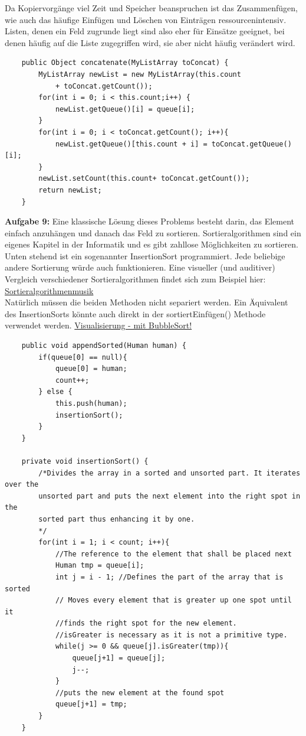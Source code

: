 \documentclass{article}
\begin{document}
Da Kopiervorgänge viel Zeit und Speicher beanspruchen ist das Zusammenfügen, wie auch das häufige Einfügen und Löschen von Einträgen ressourcenintensiv. Listen, denen ein Feld zugrunde liegt sind also eher für Einsätze geeignet, bei denen häufig auf die Liste zugegriffen wird, sie aber nicht häufig verändert wird. 
\begin{verbatim}  
    public Object concatenate(MyListArray toConcat) {
        MyListArray newList = new MyListArray(this.count
            + toConcat.getCount());
        for(int i = 0; i < this.count;i++) {
            newList.getQueue()[i] = queue[i];
        }
        for(int i = 0; i < toConcat.getCount(); i++){
            newList.getQueue()[this.count + i] = toConcat.getQueue()[i];
        }
        newList.setCount(this.count+ toConcat.getCount());
        return newList;
    }
\end{verbatim}
\textbf{Aufgabe 9:}
Eine klassische Lösung dieses Problems besteht darin, das Element einfach anzuhängen und danach das Feld zu sortieren. Sortieralgorithmen sind ein eigenes Kapitel in der Informatik und es gibt zahllose Möglichkeiten zu sortieren. Unten stehend ist ein sogenannter InsertionSort programmiert. Jede beliebige andere Sortierung würde auch funktionieren. Eine visueller (und auditiver) Vergleich verschiedener Sortieralgorithmen findet sich zum Beispiel hier: \href{https://www.youtube.com/watch?v=kPRA0W1kECg}{Sortieralgorithmenmusik} \\
Natürlich müssen die beiden Methoden nicht separiert werden. Ein Äquivalent des InsertionSorts könnte auch direkt in der sortiertEinfügen() Methode verwendet werden. \href{https://youtu.be/pv081cVm3Xw}{Visualisierung - mit BubbleSort!}
\begin{verbatim}
    public void appendSorted(Human human) {
        if(queue[0] == null){
            queue[0] = human;
            count++;
        } else {
            this.push(human);
            insertionSort();
        }
    }
    
    private void insertionSort() {
        /*Divides the array in a sorted and unsorted part. It iterates over the
        unsorted part and puts the next element into the right spot in the
        sorted part thus enhancing it by one.
        */
        for(int i = 1; i < count; i++){
            //The reference to the element that shall be placed next
            Human tmp = queue[i];
            int j = i - 1; //Defines the part of the array that is sorted
            // Moves every element that is greater up one spot until it 
            //finds the right spot for the new element.
            //isGreater is necessary as it is not a primitive type.
            while(j >= 0 && queue[j].isGreater(tmp)){
                queue[j+1] = queue[j];
                j--;
            }
            //puts the new element at the found spot
            queue[j+1] = tmp;
        }
    }
\end{verbatim}
\end{document}
